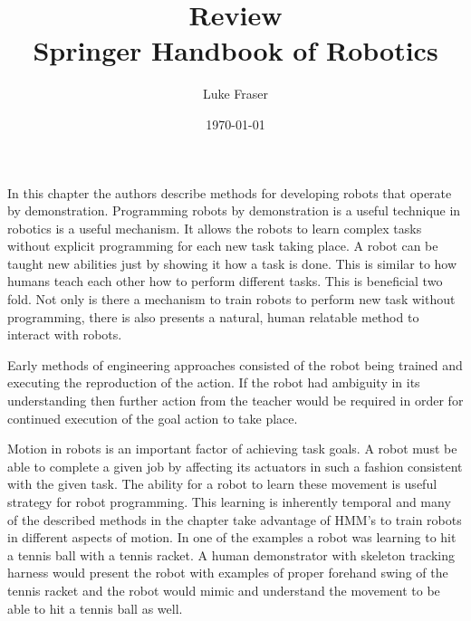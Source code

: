 \documentclass[10pt]{article}
\begin{document}
\title{{\large Review} \\ Springer Handbook of Robotics}
\author{Luke Fraser}
\date{\today}
\maketitle

\begingroup
\renewcommand{\section}[2]{}


\endgroup

\section*{Summary}
In this chapter the authors describe methods for developing robots that operate by demonstration. Programming  robots by demonstration is a useful technique in robotics is a useful mechanism. It allows the robots to learn complex tasks without explicit programming for each new task taking place. A robot can be taught new abilities just by showing it how a task is done. This is similar to how humans teach each other how to perform different tasks. This is beneficial two fold. Not only is there a mechanism to train robots to perform new task without programming, there is also presents a natural, human relatable method to interact with robots.

Early methods of engineering approaches consisted of the robot being trained and executing the reproduction of the action. If the robot had ambiguity in its understanding then further action from the teacher would be required in order for continued execution of the goal action to take place.

Motion in robots is an important factor of achieving task goals. A robot must be able to complete a given job by affecting its actuators in such a fashion consistent with the given task. The ability for a robot to learn these movement is useful strategy for robot programming. This learning is inherently temporal and many of the described methods in the chapter take advantage of HMM's to train robots in different aspects of motion. In one of the examples a robot was learning to hit a tennis ball with a tennis racket. A human demonstrator with skeleton tracking harness would present the robot with examples of proper forehand swing of the tennis racket and the robot would mimic and understand the movement to be able to hit a tennis ball as well.
\end{document}
